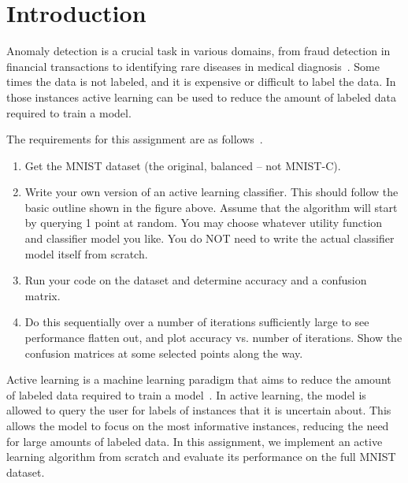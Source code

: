 \section{Introduction}
Anomaly detection is a crucial task in various domains, from fraud detection in financial transactions to identifying rare diseases in medical diagnosis~\cite{liu2008isolation}. 
Some times the data is not labeled, and it is expensive or difficult to label the data. In those instances active learning can be used to reduce the amount of labeled data required to train a model.


The requirements for this assignment are as follows~\cite{assignment8}.\par
\begin{enumerate}    
    \item Get the MNIST dataset (the original, balanced – not MNIST-C).
    \item Write your own version of an active learning classifier. This should follow the basic outline 
    shown in the figure above. Assume that the algorithm will start by querying 1 point at random. 
    You may choose whatever utility function and classifier model you like. You do NOT need to 
    write the actual classifier model itself from scratch.
    
    \item Run your code on the dataset and determine accuracy and a confusion matrix.

    \item Do this sequentially over a number of iterations sufficiently large to see performance flatten 
    out, and plot accuracy vs. number of iterations. Show the confusion matrices at some selected 
    points along the way. 
    
\end{enumerate}

Active learning is a machine learning paradigm that aims to reduce the amount of labeled data required to train a model~\cite{tharwat2023survey}.
In active learning, the model is allowed to query the user for labels of instances that it is uncertain about. 
This allows the model to focus on the most informative instances, reducing the need for large amounts of labeled data. 
In this assignment, we implement an active learning algorithm from scratch and evaluate its performance on the full MNIST dataset.\par